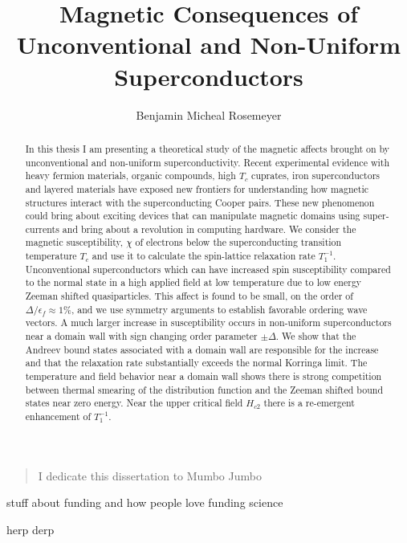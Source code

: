 \documentclass[final,dissertation]{msudoc}
\title{Magnetic Consequences of Unconventional and Non-Uniform Superconductors}
\author{Benjamin Micheal Rosemeyer}
\newcommand{\relt}{$T_1^{-1}$}
\begin{document}
\frontmatter
\maketitlepage
\makecopyrightpage
\makeapprovalpage
\makepermissionpage

\begin{dedication}
  \begin{verse}
    I dedicate this dissertation to Mumbo Jumbo
  \end{verse}
\end{dedication}

\begin{preface}

	stuff about funding and how people love funding science
	
\end{preface}

\begin{acknowledgements}

  herp derp

\end{acknowledgements}

\maketableofcontents
\makelistoftables
\makelistoffigures

\begin{abstract}
  
In this thesis I am presenting a theoretical study of the magnetic affects brought on by unconventional and non-uniform superconductivity. Recent experimental evidence with heavy fermion materials, organic compounds, high $T_c$ cuprates, iron superconductors and layered materials have exposed new frontiers for understanding how magnetic structures interact with the superconducting Cooper pairs. These new phenomenon could bring about exciting devices that can manipulate magnetic domains using super-currents and bring about a revolution in computing hardware. We consider the magnetic susceptibility, $\chi$ of electrons below the superconducting transition temperature $T_c$ and use it to calculate the spin-lattice relaxation rate \relt. Unconventional superconductors which can have increased spin susceptibility compared to the normal state in a high applied field at low temperature due to low energy Zeeman shifted quasiparticles. This affect is found to be small, on the order of $\Delta/\epsilon_f\approx 1\%$, and we use symmetry arguments to establish favorable ordering wave vectors. A much larger increase in susceptibility occurs in non-uniform superconductors near a domain wall with sign changing order parameter $\pm\Delta$. We show that the Andreev bound states associated with a domain wall are responsible for the increase and that the relaxation rate substantially exceeds the normal Korringa limit. The temperature and field behavior near a domain wall shows there is strong competition between thermal smearing of the distribution function and the Zeeman shifted bound states near zero energy. Near the upper critical field $H_{c2}$ there is a re-emergent enhancement of \relt.
  
\end{abstract}
\end{document}
